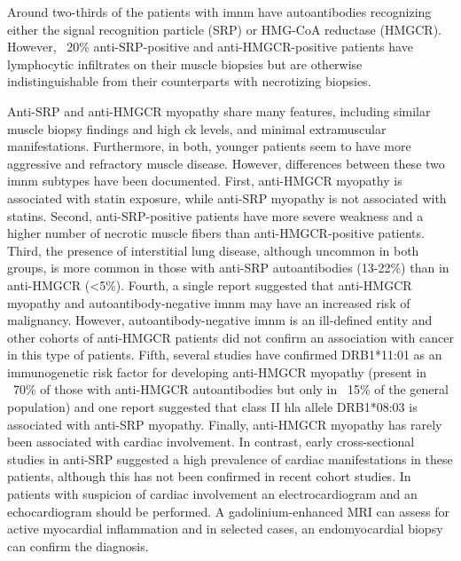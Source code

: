 Around two-thirds of the patients with \gls{imnm} have autoantibodies recognizing either the signal recognition particle (SRP) or HMG-CoA reductase (HMGCR). However, ~20\% anti-SRP-positive and anti-HMGCR-positive patients have lymphocytic infiltrates on their muscle biopsies but are otherwise indistinguishable from their counterparts with necrotizing biopsies.\cite{Suzuki2015,Mammen2011,Allenbach2018}

Anti-SRP and anti-HMGCR myopathy share many features, including similar muscle biopsy findings and high \gls{ck} levels, and minimal extramuscular manifestations.\cite{Watanabe2016} Furthermore, in both, younger patients seem to have more aggressive and refractory muscle disease.\cite{PinalFernandez2017b,Tiniakou2017} However, differences between these two \gls{imnm} subtypes have been documented. First, anti-HMGCR myopathy is associated with statin exposure,\cite{ChristopherStine2010} while anti-SRP myopathy is not associated with statins.\cite{PinalFernandez2017b,Suzuki2015} Second, anti-SRP-positive patients have more severe weakness and a higher number of necrotic muscle fibers than anti-HMGCR-positive patients.\cite{PinalFernandez2017b,Watanabe2016,Allenbach2018} Third, the presence of interstitial lung disease, although uncommon in both groups, is more common in those with anti-SRP autoantibodies (13-22\%) than in anti-HMGCR (<5\%).\cite{PinalFernandez2017b,Suzuki2015,Watanabe2016,Tiniakou2017} Fourth, a single report suggested that anti-HMGCR myopathy and autoantibody-negative \gls{imnm} may have an increased risk of malignancy.\cite{Allenbach2016} However, autoantibody-negative \gls{imnm} is an ill-defined entity and other cohorts of anti-HMGCR patients did not confirm an association with cancer in this type of patients.\cite{Tiniakou2017,Watanabe2016} Fifth, several studies have confirmed DRB1*11:01 as an immunogenetic risk factor for developing anti-HMGCR myopathy (present in ~70\% of those with anti-HMGCR autoantibodies but only in ~15\% of the general population) and one report suggested that class II \gls{hla} allele DRB1*08:03 is associated with anti-SRP myopathy.\cite{Ohnuki2016,Mammen2012,Limaye2015} Finally, anti-HMGCR myopathy has rarely been associated with cardiac involvement.\cite{Watanabe2016} In contrast, early cross-sectional studies in anti-SRP suggested a high prevalence of cardiac manifestations in these patients,\cite{Targoff1990,Kao2004} although this has not been confirmed in recent cohort studies.\cite{PinalFernandez2017b,Suzuki2015,Watanabe2016} In patients with suspicion of cardiac involvement an electrocardiogram and an echocardiogram should be performed. A gadolinium-enhanced MRI can assess for active myocardial inflammation and in selected cases, an endomyocardial biopsy can confirm the diagnosis.\cite{Chen2018}

